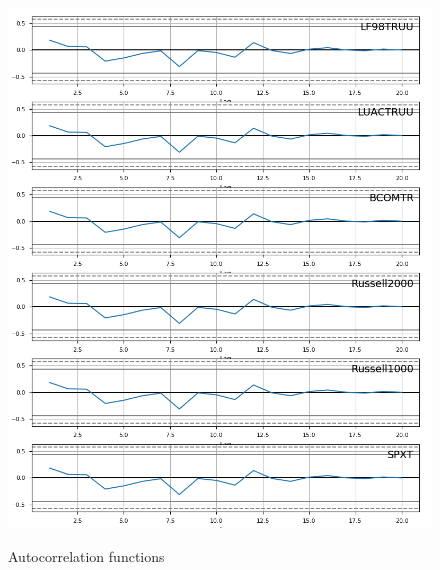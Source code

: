 \documentclass[11pt,a4paper,oneside]{article}
\begin{document}
\begin{figure}[ht]
\center
\caption{Autocorrelation functions}
\vspace{-0mm}
\label{autocorr}
\includegraphics[width=\textwidth,height=\textheight,keepaspectratio]{images/autocorr_fct.png}
\begingroup
\vspace{-5mm}
\endgroup
\end{figure}



\clearpage





   


\printbibliography[heading=none]
\end{document}

